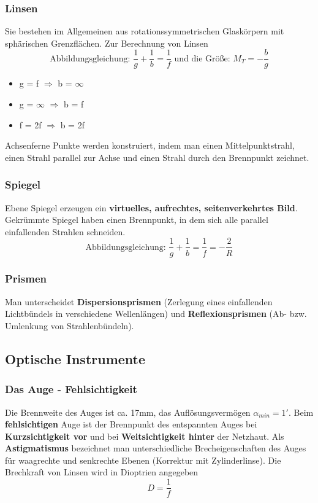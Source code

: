 \documentclass[12pt,a4paper,ngerman]{article}
\begin{document}
\subsubsection*{Linsen}
Sie bestehen im Allgemeinen aus rotationssymmetrischen Glaskörpern mit sphärischen Grenzflächen. Zur Berechnung von Linsen
\begin{equation}
 \text{Abbildungsgleichung: } \frac{1}{g} + \frac{1}{b} = \frac{1}{f} \text{ und die Größe: }M_T = -\frac{b}{g}
 \end{equation} 
 \begin{itemize}
 \item g = f $\Rightarrow$ b = $\infty$
 \item g = $\infty$ $\Rightarrow$ b = f
 \item f = 2f $\Rightarrow$ b = 2f
 \end{itemize}
 
Achsenferne Punkte werden konstruiert, indem man einen Mittelpunktstrahl, einen Strahl parallel zur Achse und einen Strahl durch den Brennpunkt zeichnet. 
 
\subsubsection*{Spiegel}
Ebene Spiegel erzeugen ein \textbf{virtuelles, aufrechtes, seitenverkehrtes Bild}. Gekrümmte Spiegel haben einen Brennpunkt, in dem sich alle parallel einfallenden Strahlen schneiden. 
\begin{equation}
 \text{Abbildungsgleichung: } \frac{1}{g} + \frac{1}{b} = \frac{1}{f} = -\frac{2}{R}
 \end{equation}
\subsubsection*{Prismen}
Man unterscheidet \textbf{Dispersionsprismen} (Zerlegung eines einfallenden Lichtbündels in verschiedene Wellenlängen) und \textbf{Reflexionsprismen} (Ab- bzw. Umlenkung von Strahlenbündeln). 

\pagebreak

\subsection{Optische Instrumente}

\subsubsection*{Das Auge - Fehlsichtigkeit}
Die Brennweite des Auges ist ca. 17mm, das Auflösungsvermögen $\alpha_{min} = 1'$. Beim \textbf{fehlsichtigen} Auge ist der Brennpunkt des entspannten Auges bei \textbf{Kurzsichtigkeit vor} und bei \textbf{Weitsichtigkeit hinter} der Netzhaut. Als \textbf{Astigmatismus} bezeichnet man unterschiedliche Brecheigenschaften des Auges für waagrechte und senkrechte Ebenen (Korrektur mit Zylinderlinse). Die Brechkraft von Linsen wird in Dioptrien angegeben
\begin{equation}
D = \frac{1}{f}
\end{equation}
\end{document}
